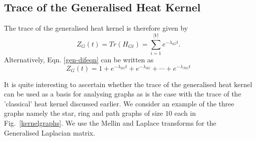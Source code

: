 \documentclass[10pt,a4paper]{article}
\begin{document}
        \subsection{Trace of the Generalised Heat Kernel}
        The trace of the generalised heat kernel is therefore given by
        \begin{equation}
        Z_{G}(t) = Tr(H_{Gt}) = \sum_{i=1}^{|V|} e^{-\lambda_{iG} t}.
        \label{Genkerneltrace}
        \end{equation}
        Alternatively, Eqn. \ref{gen-difeqn} can be written as 
        \begin{equation}
        Z_{G}(t) =  1+ e^{-\lambda_{2G} t} + e^{-\lambda_{3G}} + \cdots + e^{-\lambda_{NG} t}
        \end{equation}
        
        It is quite interesting to ascertain whether the trace of the generalised heat kernel can be used as a basis for analysing graphs as is the case with the trace of the 'classical' heat kernel discussed earlier.
        We consider an example of the three graphs namely the star, ring and path graphs of size $10$ each in Fig.~\ref{kernelgraphs}. We use the Mellin and Laplace transforms for the Generalised Laplacian matrix.
\end{document}
